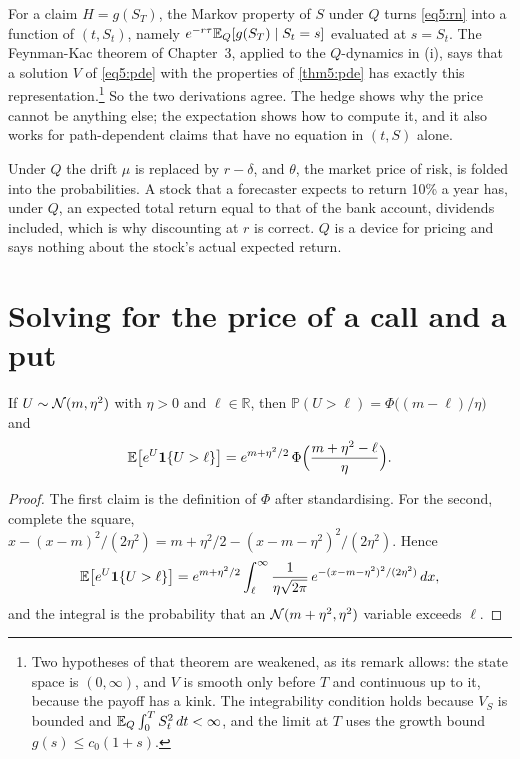 \begin{chapterrefs}
For a claim $H=g(S_T)$, the Markov property of $S$ under $Q$ turns \cref{eq5:rn} into a function of
$(t,S_t)$, namely $e^{-r\tau}\mathbb{E}_Q[g(S_T)\mid S_t=s]$ evaluated at $s=S_t$. The Feynman-Kac theorem of
Chapter~3, applied to the $Q$-dynamics in (i), says that a solution $V$ of \cref{eq5:pde} with the
properties of \cref{thm5:pde} has exactly this representation.\footnote{Two hypotheses of that theorem
are weakened, as its remark allows: the state space is $(0,\infty)$, and $V$ is smooth only before $T$
and continuous up to it, because the payoff has a kink. The integrability condition holds because
$V_S$ is bounded and $\mathbb{E}_Q\int_0^TS_t^2\,dt<\infty$, and the limit at $T$ uses the growth bound
$g(s)\le c_0(1+s)$.} So the two derivations agree. The hedge shows why the price cannot be anything
else; the expectation shows how to compute it, and it also works for path-dependent claims that have
no equation in $(t,S)$ alone.

Under $Q$ the drift $\mu$ is replaced by $r-\delta$, and $\theta$, the market price of risk, is folded
into the probabilities. A stock that a forecaster expects to return 10\% a year has, under $Q$, an
expected total return equal to that of the bank account, dividends included, which is why discounting
at $r$ is correct. $Q$ is a device for pricing and says nothing about the stock's actual expected
return.

\section{Solving for the price of a call and a put}
\label{sec5:formula}

\begin{lemma}\label{lem5:lognormal}
If $U\sim\mathcal{N}(m,\eta^2)$ with $\eta>0$ and $\ell\in\mathbb R$, then $\mathbb P(U>\ell)=\Phi\bigl((m-\ell)/\eta\bigr)$ and
\begin{equation}\label{eq5:partial}
  \mathbb{E}\bigl[e^U\mathbf 1\{U>\ell\}\bigr]=e^{m+\eta^2/2}\,\Phi\Bigl(\frac{m+\eta^2-\ell}{\eta}\Bigr).
\end{equation}
\end{lemma}

\begin{proof}
The first claim is the definition of $\Phi$ after standardising. For the second, complete the square,
$x-(x-m)^2/(2\eta^2)=m+\eta^2/2-(x-m-\eta^2)^2/(2\eta^2)$. Hence
\begin{equation*}
  \mathbb{E}\bigl[e^U\mathbf 1\{U>\ell\}\bigr]=e^{m+\eta^2/2}\int_\ell^\infty\frac{1}{\eta\sqrt{2\pi}}\,e^{-(x-m-\eta^2)^2/(2\eta^2)}\,dx ,
\end{equation*}
and the integral is the probability that an $\mathcal{N}(m+\eta^2,\eta^2)$ variable exceeds $\ell$.
\end{proof}


\end{chapterrefs}
